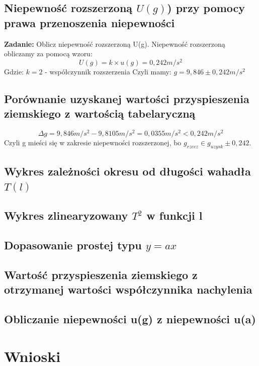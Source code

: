 \documentclass[18pt, twoside]{article}
\begin{document}
	\subsection{Niepewność rozszerzoną \(U(g)\)) przy pomocy prawa przenoszenia niepewności}
	\textbf{Zadanie:} Oblicz niepewność rozszerzoną U(g).\newline
	Niepewność rozszerzoną obliczamy za pomocą wzoru:
	\[U(g) = k \times u(g) = 0,242 m/s^2\]
	Gdzie:  \( k = 2\) - współczynnik rozszerzenia
	Czyli mamy: \(g = 9,846 \pm  0,242 m/s^2\)
	
	\subsection{Porównanie uzyskanej wartości przyspieszenia ziemskiego z wartością tabelaryczną}
	\[\Delta g = 9,846 m/s^2 - 9,8105 m/s^2 = 0,0355 m/s^2 < 0,242 m/s^2\] Czyli g mieści się w zakresie niepewności rozszerzonej, bo \( g_{rzecz}\in g_{uzysk} \pm 0,242  \).
	
	\subsection{Wykres zależności okresu od długości wahadła \(T(l)\)}
	\subsection{Wykres zlinearyzowany \(T^2\) w funkcji l}
	
	\subsection{Dopasowanie prostej typu \(y = ax\)}
	\subsection{Wartość przyspieszenia 
	ziemskiego z otrzymanej wartości współczynnika nachylenia}
	
	\subsection{Obliczanie niepewności u(g) z niepewności u(a) }
	\section{Wnioski}
\end{document}

